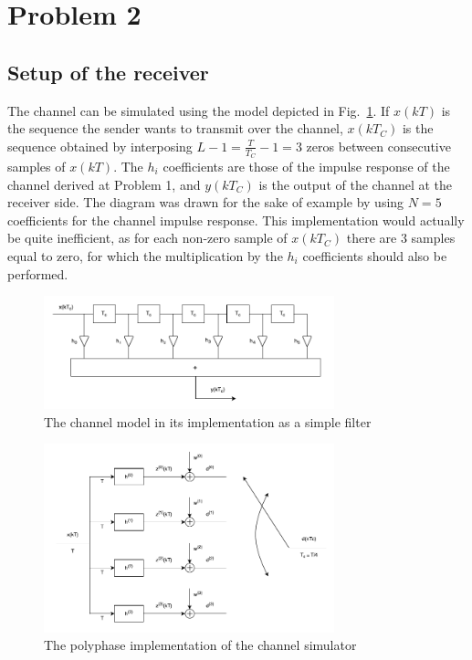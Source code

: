 \documentclass[10pt]{article}
\begin{document}
\clearpage

\section*{Problem 2}

\subsection*{Setup of the receiver}

The channel can be simulated using the model depicted in Fig.~\ref{fig:channel_model}. If $x(kT)$ is the sequence the sender wants to transmit over the channel, $x(kT_C)$ is the sequence obtained by interposing $L - 1 = \frac{T}{T_C} - 1 = 3$ zeros between consecutive samples of $x(kT)$. The $h_i$ coefficients are those of the impulse response of the channel derived at Problem 1, and $y(kT_C)$ is the output of the channel at the receiver side. The diagram was drawn for the sake of example by using $N = 5$ coefficients for the channel impulse response. This implementation would actually be quite inefficient, as for each non-zero sample of $x(kT_C)$ there are 3 samples equal to zero, for which the multiplication by the $h_i$ coefficients should also be performed.

\begin{figure}[ht]
	\centering
	\includegraphics[width=0.75\textwidth]{channel_model}
	\caption{The channel model in its implementation as a simple filter}
    \label{fig:channel_model}
\end{figure}

\begin{figure}[ht]
	\centering
	\includegraphics[width=0.75\textwidth]{polyphase}
	\caption{The polyphase implementation of the channel simulator}
    \label{fig:polyphase}
\end{figure}
\end{document}
